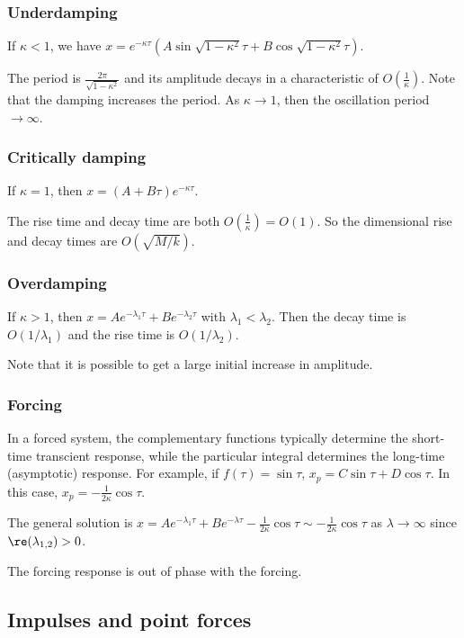 \documentclass[a4paper]{article}
\begin{document}
\subsubsection{Underdamping}

If $\kappa < 1$, we have $x = e^{-\kappa\tau}(A\sin \sqrt{1 - \kappa^2}\tau  +B\cos \sqrt{1 - \kappa^2}\tau)$.

The period is $\frac{2\pi}{\sqrt{1 - \kappa^2}}$ and its amplitude decays in a characteristic of $O(\frac{1}{\kappa})$. Note that the damping increases the period. As $\kappa \to 1$, then the oscillation period $\to \infty$.

\subsubsection{Critically damping}
If $\kappa = 1$, then $x = (A + B\tau)e^{-\kappa\tau}$.

The rise time and decay time are both $O(\frac{1}{\kappa}) = O(1)$. So the dimensional rise and decay times are $O(\sqrt{M/k})$.


\subsubsection{Overdamping}
If $\kappa > 1$, then $x = Ae^{-\lambda_1\tau} + Be^{-\lambda_2\tau}$ with $\lambda_1 < \lambda_2$. Then the decay time is $O(1/\lambda_1)$ and the rise time is $O(1/\lambda_2)$.

Note that it is possible to get a large initial increase in amplitude.

\subsubsection{Forcing}
In a forced system, the complementary functions typically determine the short-time transcient response, while the particular integral determines the long-time (asymptotic) response.
For example, if $f(\tau) = \sin\tau$, $x_p = C\sin \tau + D\cos\tau$. In this case, $x_p = -\frac{1}{2\kappa}\cos\tau$.

The general solution is $x = Ae^{-\lambda_1\tau} + Be^{-\lambda \tau} - \frac{1}{2\kappa}\cos\tau \sim -\frac{1}{2\kappa}\cos\tau$ as $\lambda\to \infty$ since $\re (\lambda_{1, 2}) > 0$.

\note The forcing response is out of phase with the forcing.
\subsection{Impulses and point forces}
\end{document}
